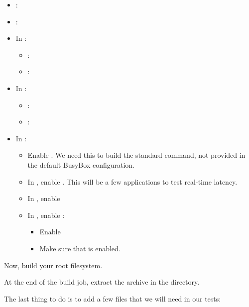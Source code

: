 \begin{itemize}
\item {}:  
\item {}: 
\item In :
   \begin{itemize}
   \item {}: 
   \item {}: 
   \end{itemize}
\item In : 
   \begin{itemize}
   \item {}: 
   \item {}: 
   \end{itemize}
\item In :
   \begin{itemize}
   \item Enable .
         We need this to build the standard  command, not
         provided in the default BusyBox configuration.
   \item In , enable
         . This will be a few applications to test
         real-time latency.
   \item In , enable 
   \item In , enable :
         \begin{itemize}
         \item Enable 
	 \item Make sure that  is enabled.
  	 \end{itemize}
   \end{itemize}
\end{itemize}

Now, build your root filesystem.

At the end of the build job, extract the
 archive in the 
directory.

The last thing to do is to add a few files that we will need in our
tests:

